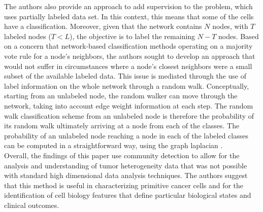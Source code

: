 The authors also provide an approach to add supervision to the problem, which uses partially labeled data set. In this context, this means that some of the cells have a classification. Moreover, given that the network contains $N$ nodes, with $T$ labeled nodes ($T<L$), the objective is to label the remaining $N-T$ nodes. Based on a concern that network-based classification methods operating on a majority vote rule for a node's neighbors, the authors sought to develop an approach that would not suffer in circumstances where a node's closest neighbors were a small subset of the available labeled data. This issue is mediated through the use of label information on the whole network through a random walk. Conceptually, starting from an unlabeled node, the random walker can move through the network, taking into account edge weight information at each step. The random walk classification scheme from an unlabeled node is therefore the probability of its random walk ultimately arriving at a node from each of the classes.  The probability of an unlabeled node reaching a node in each of the labeled classes can be computed in a straightforward way, using the graph laplacian \cite{RWR}. \\
\indent Overall, the findings of this paper use community detection to allow for the analysis and understanding of tumor heterogeneity data that was not possible with standard high dimensional data analysis techniques.  The authors suggest that this method is useful in characterizing primitive cancer cells and for the identification of cell biology features that define particular biological states and clinical outcomes. 

